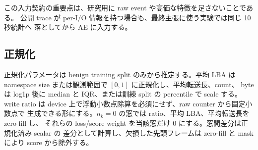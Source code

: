 この入力契約の重要点は、研究用に raw event や高価な特徴を足さないことである。
公開 trace が per-I/O 情報を持つ場合も、最終主張に使う実験では同じ 10 秒統計へ
落としてから AE に入力する。

\subsection{正規化}

正規化パラメータは benign training split のみから推定する。平均 LBA は
namespace size または観測範囲で $[0,1]$ に正規化し、平均転送長、count、
byte は log1p 後に median と IQR、または訓練 split の percentile で scale する。
write ratio は device 上で浮動小数点除算を必須にせず、raw counter から固定小数点で
生成できる形にする。$n_k=0$ の窓では ratio、平均 LBA、平均転送長を zero-fill し、
それらの loss/score weight を当該窓だけ 0 にする。窓間差分は正規化済み scalar の
差分として計算し、欠損した先頭フレームは zero-fill と mask により score から除外する。

